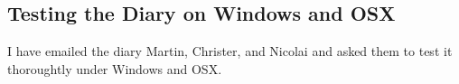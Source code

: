 \subsection{Testing the Diary on Windows and OSX}
\label{task:20140905_jkn0}
I have emailed the diary Martin, Christer, and Nicolai and asked them to test it thoroughtly under Windows and OSX.
